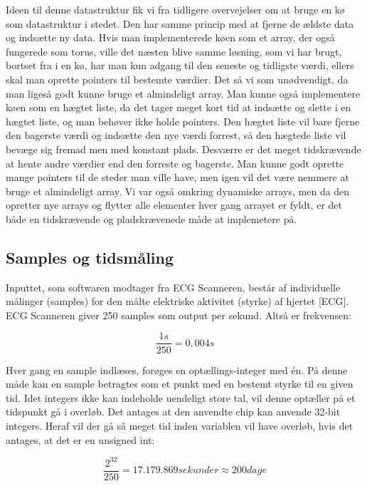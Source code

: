\documentclass{article}
\begin{document}
Ideen til denne datastruktur fik vi fra tidligere overvejelser om at bruge en kø som datastruktur i stedet. Den har samme princip med at fjerne de ældste data og indsætte ny data. Hvis man implementerede køen som et array, der også fungerede som torus, ville det næsten blive samme løsning, som vi har brugt, bortset fra i en kø, har man kun adgang til den seneste og tidligste værdi, ellers skal man oprette pointers til bestemte værdier. Det så vi som unødvendigt, da man ligeså godt kunne bruge et almindeligt array. Man kunne også implementere køen som en hægtet liste, da det tager meget kort tid at indsætte og slette i en hægtet liste, og man behøver ikke holde pointers. Den hægtet liste vil bare fjerne den bagerste værdi og indsætte den nye værdi forrest, så den hægtede liste vil bevæge sig fremad men med konstant plads. Desværre er det meget tidskrævende at hente andre værdier end den forreste og bagerste. Man kunne godt oprette mange pointers til de steder man ville have, men igen vil det være nemmere at bruge et almindeligt array.
Vi var også omkring dynamiske arrays, men da den opretter nye arrays og flytter alle elementer hver gang arrayet er fyldt, er det både en tidskrævende og pladskrævenede måde at implemetere på.

\subsection{Samples og tidsmåling}
Inputtet, som softwaren modtager fra ECG Scanneren, består af individuelle målinger (samples) for den målte elektriske aktivitet (styrke) af hjertet [ECG]. ECG Scanneren giver 250 samples som output per sekund. Altså er frekvensen:

\begin{equation} 
\frac{1s}{250} = 0,004s
\end{equation}

Hver gang en sample indlæses, forøges en optællings-integer med én. På denne måde kan en sample betragtes som et punkt med en bestemt styrke til en given tid. Idet integers ikke kan indeholde uendeligt store tal, vil denne optæller på et tidspunkt gå i overløb. Det antages at den anvendte chip kan anvende 32-bit integers. Heraf vil der gå så meget tid inden variablen vil have overløb, hvis det antages, at det er en unsigned int:

\begin{equation}
\frac{2^{32}}{250} = 17.179.869 sekunder \approx 200 dage
\end{equation}
\end{document}

